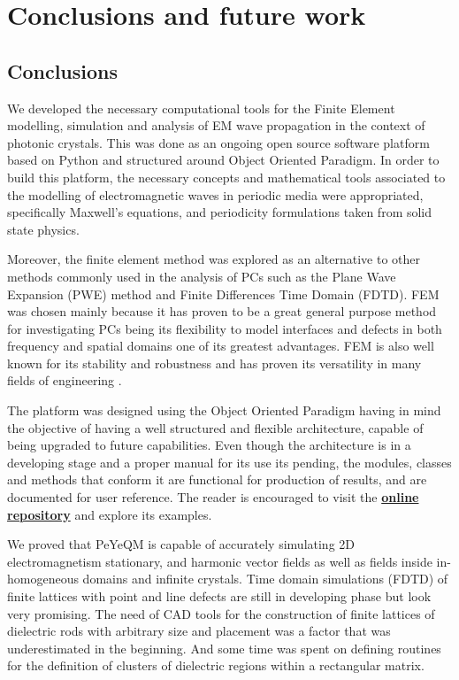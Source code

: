 \chapter{Conclusions and future work}

\section{Conclusions}

We developed the necessary computational tools for the Finite Element modelling, simulation and analysis of EM wave propagation in the context of photonic crystals.  This was done as an ongoing open source software platform based on Python and structured around Object Oriented Paradigm. 
In order to build this platform, the necessary concepts and mathematical tools associated to the modelling of electromagnetic waves in periodic media were appropriated, specifically Maxwell's equations, and periodicity formulations taken from solid state physics. 

Moreover, the finite element method was explored as an alternative to other methods commonly used in the analysis of PCs such as the Plane Wave Expansion (PWE) \cite{StevenJohnson2001} method and Finite Differences Time Domain (FDTD)\cite{Oskooi2009}. FEM was chosen mainly because it has proven to be a great general purpose method for investigating PCs \cite{Andonegui2013} being its flexibility to model interfaces and defects in both frequency and spatial domains one of its greatest advantages. FEM is also well known for its stability and robustness and has proven its versatility in many fields of engineering \cite{Bathe1996, Ram2002, Zienkiewicz2005, Logg2012}.

The platform was designed using the Object Oriented Paradigm having in mind the objective of having a well structured and flexible architecture, capable of being upgraded to future capabilities. Even though the architecture is in a developing stage and a proper manual for its use its pending, the modules, classes and methods that conform it are functional for production of results, and are documented for user reference. The reader is encouraged to visit the \href{https://github.com/bebopsan/peyeQM/tree/Depuration}{\textbf{online repository}}  and explore its examples.

We proved that PeYeQM is capable of accurately simulating  2D electromagnetism stationary, and harmonic vector fields as well as fields inside in-homogeneous domains and infinite crystals. Time domain simulations (FDTD) of finite lattices with point and line defects are still in developing phase but look very promising. The need of CAD tools for the construction of finite lattices of dielectric rods with arbitrary size and placement was a factor that was underestimated in the beginning. And some time was spent on defining routines for the definition of clusters of  dielectric regions within a rectangular matrix.      

